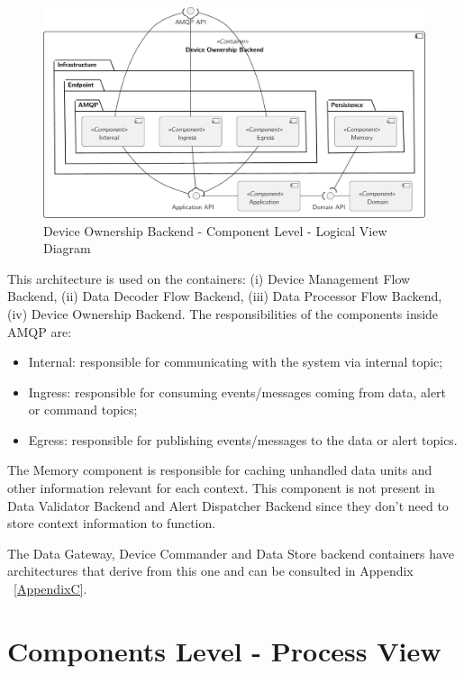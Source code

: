 \begin{figure}[H]
   \centering
   \includegraphics[page=1,width=\columnwidth]{assets/diagrams/design/architectural/level3/logical/device-ownership-backend.pdf}
   \caption[Device Ownership Backend - Component Level - Logical View Diagram]{Device Ownership Backend - Component Level - Logical View Diagram}
   \label{fig:design:architecture:platform:component:logical:diagram:ownership}
\end{figure}

This architecture is used on the containers: (i) Device Management Flow Backend, (ii) Data Decoder Flow Backend, (iii) Data Processor Flow Backend, (iv) Device Ownership Backend. The responsibilities of the components inside AMQP are:

\begin{itemize}
   \item Internal: responsible for communicating with the system via internal topic;
   \item Ingress: responsible for consuming events/messages coming from data, alert or command topics;
   \item Egress: responsible for publishing events/messages to the data or alert topics.
\end{itemize}

The Memory component is responsible for caching unhandled data units and other information relevant for each context. This component is not present in Data Validator Backend and Alert Dispatcher Backend since they don't need to store context information to function.

The Data Gateway, Device Commander and Data Store backend containers have architectures that derive from this one and can be consulted in Appendix ~\ref{AppendixC}.

\section{Components Level - Process View}
\label{par:design:architecture:platform:components:process}

